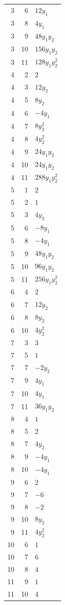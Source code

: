 \documentclass[10pt,a4paper]{article}
\begin{document}
{\begin{longtable}{rrp{125mm}}
3 & 6 & $12 y_{1}$\\
3 & 8 & $4 y_{1}$\\
3 & 9 & $48 y_{1} y_{2}$\\
3 & 10 & $156 y_{1} y_{2}$\\
3 & 11 & $128 y_{1} y_{2}^{2}$\\
4 & 2 & $2$\\
4 & 3 & $12 y_{2}$\\
4 & 5 & $8 y_{2}$\\
4 & 6 & $- 4 y_{1}$\\
4 & 7 & $8 y_{2}^{2}$\\
4 & 8 & $4 y_{2}^{2}$\\
4 & 9 & $24 y_{1} y_{2}$\\
4 & 10 & $24 y_{1} y_{2}$\\
4 & 11 & $288 y_{1} y_{2}^{2}$\\
5 & 1 & $2$\\
5 & 2 & $1$\\
5 & 3 & $4 y_{2}$\\
5 & 6 & $- 8 y_{1}$\\
5 & 8 & $- 4 y_{1}$\\
5 & 9 & $48 y_{1} y_{2}$\\
5 & 10 & $96 y_{1} y_{2}$\\
5 & 11 & $256 y_{1} y_{2}^{2}$\\
6 & 4 & $2$\\
6 & 7 & $12 y_{2}$\\
6 & 8 & $8 y_{2}$\\
6 & 10 & $4 y_{2}^{2}$\\
7 & 3 & $3$\\
7 & 5 & $1$\\
7 & 7 & $- 2 y_{2}$\\
7 & 9 & $4 y_{1}$\\
7 & 10 & $4 y_{1}$\\
7 & 11 & $36 y_{1} y_{2}$\\
8 & 4 & $1$\\
8 & 5 & $2$\\
8 & 7 & $4 y_{2}$\\
8 & 9 & $- 4 y_{1}$\\
8 & 10 & $- 4 y_{1}$\\
9 & 6 & $2$\\
9 & 7 & $-6$\\
9 & 8 & $-2$\\
9 & 10 & $8 y_{2}$\\
9 & 11 & $4 y_{2}^{2}$\\
10 & 6 & $1$\\
10 & 7 & $6$\\
10 & 8 & $4$\\
11 & 9 & $1$\\
11 & 10 & $4$\\
\end{longtable}}
\end{document}
